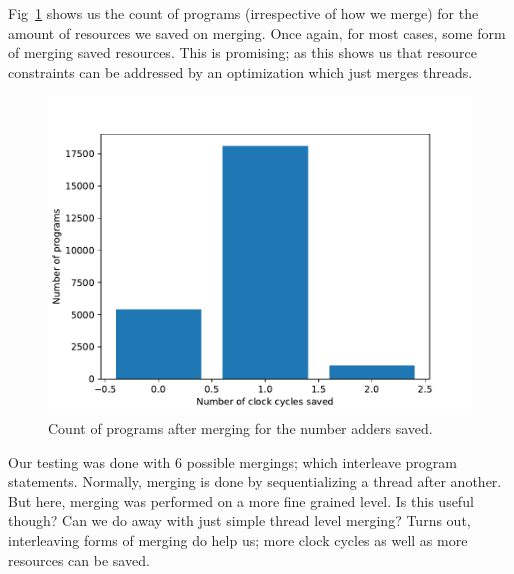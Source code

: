     Fig~\ref{Fig4} shows us the count of programs (irrespective of how we merge) for the amount of resources we saved on merging.
    Once again, for most cases, some form of merging saved resources. 
    This is promising; as this shows us that resource constraints can be addressed by an optimization which just merges threads. 
    \begin{figure}
        \centering
        \includegraphics[scale=0.5]{add_count.pdf}
        \caption{Count of programs after merging for the number adders saved.}
        \label{Fig4}
    \end{figure}

    Our testing was done with 6 possible mergings; which interleave program statements. 
    Normally, merging is done by sequentializing a thread after another. 
    But here, merging was performed on a more fine grained level. 
    Is this useful though? Can we do away with just simple thread level merging? 
    Turns out, interleaving forms of merging do help us; more clock cycles as well as more resources can be saved.

